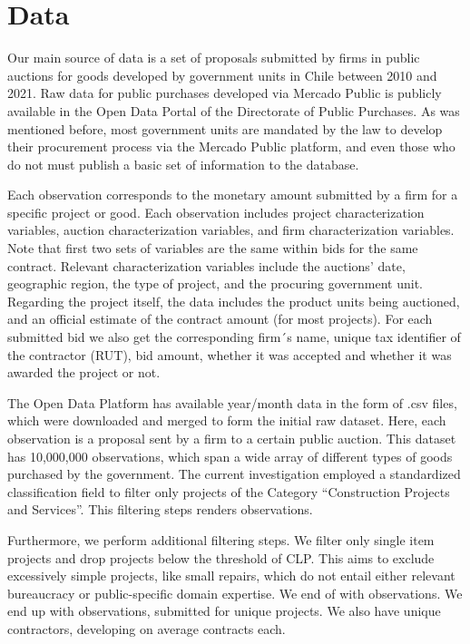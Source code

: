 
\chapter{Data}

Our main source of data is a set of proposals submitted by firms in public auctions for goods developed by government units in Chile between 2010 and 2021. Raw data for public purchases developed via Mercado Public is publicly available in the Open Data Portal of the Directorate of Public Purchases. As was mentioned before, most government units are mandated by the law to develop their procurement process via the Mercado Public platform, and even those who do not must publish a basic set of information to the database.

Each observation corresponds to the monetary amount submitted by a firm for a specific project or good. Each observation includes project characterization variables, auction characterization variables, and firm characterization variables.  Note that first two sets of variables are the same within bids for the same contract. Relevant characterization variables include the auctions’ date, geographic region, the type of project, and the procuring government unit. Regarding the project itself, the data includes the product units being auctioned, and an official estimate of the contract amount (for most projects). For each submitted bid we also get the corresponding firm´s name, unique tax identifier of the contractor (RUT), bid amount, whether it was accepted and whether it was awarded the project or not.

The Open Data Platform has available year/month data in the form of .csv files, which were downloaded and merged to form the initial raw dataset. Here, each observation is a proposal sent by a firm to a certain public auction. This dataset has 10,000,000 observations, which span a wide array of different types of goods purchased by the government. The current investigation employed a standardized classification field to filter only projects of the Category “Construction Projects and Services”. This filtering steps renders observations.

Furthermore, we perform additional filtering steps. We filter only single item projects and drop projects below the threshold of CLP. This aims to exclude excessively simple projects, like small repairs, which do not entail either relevant bureaucracy or public-specific domain expertise. We end of with observations. We end up with observations, submitted for unique projects. We also have unique contractors, developing on average contracts each.

